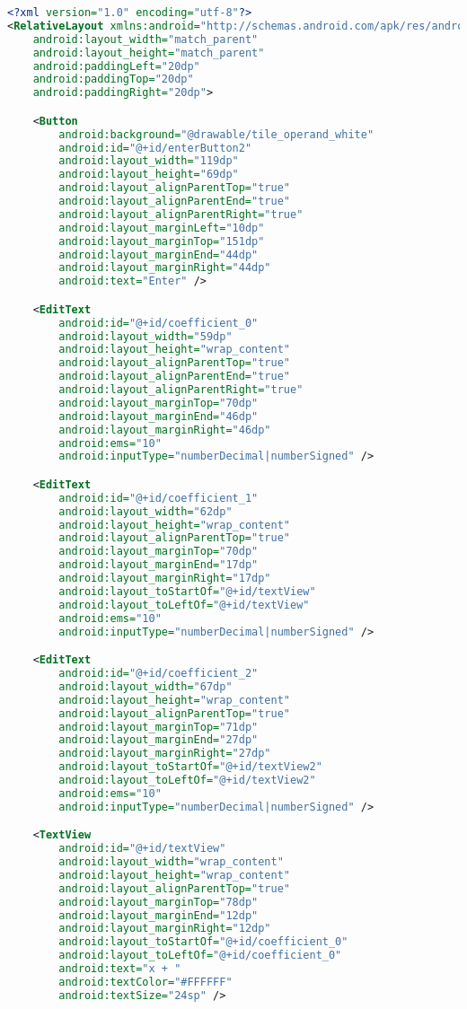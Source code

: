 \begin{lstlisting}[caption=input\_polynomial.xml,label=list:input_polynomial.xml,language=XML]
<?xml version="1.0" encoding="utf-8"?>
<RelativeLayout xmlns:android="http://schemas.android.com/apk/res/android"
    android:layout_width="match_parent"
    android:layout_height="match_parent"
    android:paddingLeft="20dp"
    android:paddingTop="20dp"
    android:paddingRight="20dp">

    <Button
        android:background="@drawable/tile_operand_white"
        android:id="@+id/enterButton2"
        android:layout_width="119dp"
        android:layout_height="69dp"
        android:layout_alignParentTop="true"
        android:layout_alignParentEnd="true"
        android:layout_alignParentRight="true"
        android:layout_marginLeft="10dp"
        android:layout_marginTop="151dp"
        android:layout_marginEnd="44dp"
        android:layout_marginRight="44dp"
        android:text="Enter" />

    <EditText
        android:id="@+id/coefficient_0"
        android:layout_width="59dp"
        android:layout_height="wrap_content"
        android:layout_alignParentTop="true"
        android:layout_alignParentEnd="true"
        android:layout_alignParentRight="true"
        android:layout_marginTop="70dp"
        android:layout_marginEnd="46dp"
        android:layout_marginRight="46dp"
        android:ems="10"
        android:inputType="numberDecimal|numberSigned" />

    <EditText
        android:id="@+id/coefficient_1"
        android:layout_width="62dp"
        android:layout_height="wrap_content"
        android:layout_alignParentTop="true"
        android:layout_marginTop="70dp"
        android:layout_marginEnd="17dp"
        android:layout_marginRight="17dp"
        android:layout_toStartOf="@+id/textView"
        android:layout_toLeftOf="@+id/textView"
        android:ems="10"
        android:inputType="numberDecimal|numberSigned" />

    <EditText
        android:id="@+id/coefficient_2"
        android:layout_width="67dp"
        android:layout_height="wrap_content"
        android:layout_alignParentTop="true"
        android:layout_marginTop="71dp"
        android:layout_marginEnd="27dp"
        android:layout_marginRight="27dp"
        android:layout_toStartOf="@+id/textView2"
        android:layout_toLeftOf="@+id/textView2"
        android:ems="10"
        android:inputType="numberDecimal|numberSigned" />

    <TextView
        android:id="@+id/textView"
        android:layout_width="wrap_content"
        android:layout_height="wrap_content"
        android:layout_alignParentTop="true"
        android:layout_marginTop="78dp"
        android:layout_marginEnd="12dp"
        android:layout_marginRight="12dp"
        android:layout_toStartOf="@+id/coefficient_0"
        android:layout_toLeftOf="@+id/coefficient_0"
        android:text="x + "
        android:textColor="#FFFFFF"
        android:textSize="24sp" />


\end{lstlisting}

